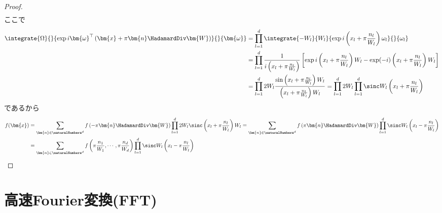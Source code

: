 \begin{proof}
\begin{align*}
			\end{align*}
			ここで
			\begin{align*}
				\integrate{\Omega}{}{\exp i \bm{\omega}^\top\left(\bm{x} + \pi\bm{n}\HadamardDiv\bm{W}\right) }{}{\bm{\omega}} &= \prod_{l=1}^d \integrate{-W_l}{W_l}{\exp i\left(x_l + \pi\frac{n_l}{W_l}\right)\omega_l}{}{\omega_l} \\
				&= \prod_{l=1}^d \frac{1}{i\left(x_l + \pi\frac{n_l}{W_l}\right)}\left[\exp i\left(x_l + \pi\frac{n_l}{W_l}\right)W_l - \exp (-i)\left(x_l + \pi\frac{n_l}{W_l}\right)W_l\right] \\
				&= \prod_{l=1}^d 2W_l \frac{\sin \left(x_l + \pi\frac{n_l}{W_l}\right)W_l}{\left(x_l + \pi\frac{n_l}{W_l}\right)W_l} = \prod_{l=1}^d 2W_l \prod_{l=1}^d \sinc W_l\left(x_l + \pi\frac{n_l}{W_l}\right)
			\end{align*}
			であるから
			\begin{align*}
				f(\bm{x}) &= \sum_{\bm{n}\in\naturalNumbers^d} f\left(-\pi\bm{n}\HadamardDiv\bm{W}\right) \prod_{l=1}^d 2W_l \sinc \left(x_l + \pi\frac{n_l}{W_l}\right)W_l = \sum_{\bm{n}\in\naturalNumbers^d} f\left(\pi\bm{n}\HadamardDiv\bm{W}\right) \prod_{l=1}^d \sinc W_l\left(x_l - \pi\frac{n_l}{W_l}\right) \\
				&= \sum_{\bm{n}\in\naturalNumbers^d} f\left(\pi\frac{n_1}{W_1},\cdots,\pi\frac{n_d}{W_d}\right) \prod_{l=1}^d \sinc W_l\left(x_l - \pi\frac{n_l}{W_l}\right)
			\end{align*}
		\end{proof}
	\chapter{高速Fourier変換(FFT)}
